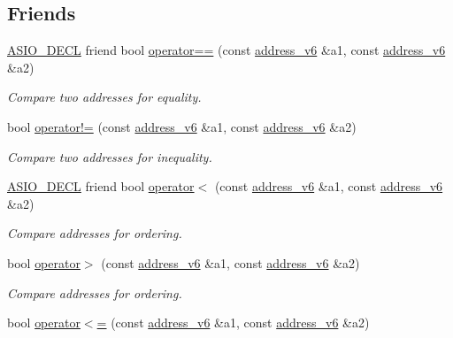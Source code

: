 \subsection*{Friends}
\begin{DoxyCompactItemize}
\item 
\hyperlink{config_8hpp_ab54d01ea04afeb9a8b39cfac467656b7}{A\+S\+I\+O\+\_\+\+D\+E\+C\+L} friend bool \hyperlink{classasio_1_1ip_1_1address__v6_a897294ec4e42e93e13d5d565015bce44}{operator==} (const \hyperlink{classasio_1_1ip_1_1address__v6}{address\+\_\+v6} \&a1, const \hyperlink{classasio_1_1ip_1_1address__v6}{address\+\_\+v6} \&a2)
\begin{DoxyCompactList}\small\item\em Compare two addresses for equality. \end{DoxyCompactList}\item 
bool \hyperlink{classasio_1_1ip_1_1address__v6_a885fecdb8d4e9609ab8d4c2defa69acf}{operator!=} (const \hyperlink{classasio_1_1ip_1_1address__v6}{address\+\_\+v6} \&a1, const \hyperlink{classasio_1_1ip_1_1address__v6}{address\+\_\+v6} \&a2)
\begin{DoxyCompactList}\small\item\em Compare two addresses for inequality. \end{DoxyCompactList}\item 
\hyperlink{config_8hpp_ab54d01ea04afeb9a8b39cfac467656b7}{A\+S\+I\+O\+\_\+\+D\+E\+C\+L} friend bool \hyperlink{classasio_1_1ip_1_1address__v6_a944d80cea6e71a4849f9da8d240de215}{operator$<$} (const \hyperlink{classasio_1_1ip_1_1address__v6}{address\+\_\+v6} \&a1, const \hyperlink{classasio_1_1ip_1_1address__v6}{address\+\_\+v6} \&a2)
\begin{DoxyCompactList}\small\item\em Compare addresses for ordering. \end{DoxyCompactList}\item 
bool \hyperlink{classasio_1_1ip_1_1address__v6_aef4f2f72bd266f305d6a9dd83724f0fa}{operator$>$} (const \hyperlink{classasio_1_1ip_1_1address__v6}{address\+\_\+v6} \&a1, const \hyperlink{classasio_1_1ip_1_1address__v6}{address\+\_\+v6} \&a2)
\begin{DoxyCompactList}\small\item\em Compare addresses for ordering. \end{DoxyCompactList}\item 
bool \hyperlink{classasio_1_1ip_1_1address__v6_a16f2c75d00f8782ed0e4f9e6a1e06abe}{operator$<$=} (const \hyperlink{classasio_1_1ip_1_1address__v6}{address\+\_\+v6} \&a1, const \hyperlink{classasio_1_1ip_1_1address__v6}{address\+\_\+v6} \&a2)

\end{DoxyCompactItemize}
